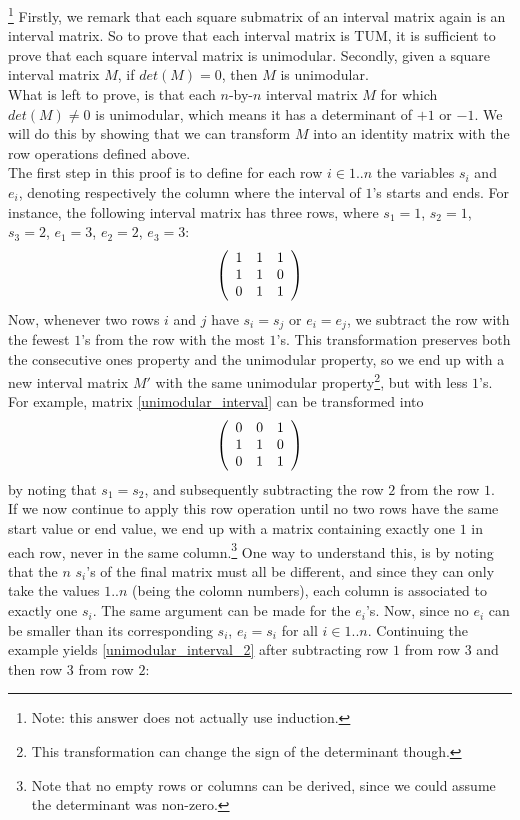 {\begin{exercise}
\begin{hint}
\begin{enumerate}
\end{enumerate}
\end{hint}
\begin{answer}
\footnote{Note: this answer does not actually use induction.}
Firstly, we remark that each square submatrix of an interval matrix again is an interval matrix. So to prove that each interval matrix is TUM, it is sufficient to prove that each square interval matrix is unimodular. Secondly, given a square interval matrix $M$, if $det(M)=0$, then $M$ is unimodular.\\
What is left to prove, is that each $n$-by-$n$ interval matrix $M$ for which $det(M)\neq 0$ is unimodular, which means it has a determinant of $+1$ or $-1$. We will do this by showing that we can transform $M$ into an identity matrix with the row operations defined above.\\
The first step in this proof is to define for each row $i \in 1..n$ the variables $s_i$ and $e_i$, denoting respectively the column where the interval of $1$'s starts and ends. For instance, the following interval matrix has three rows, where $s_1=1$, $s_2=1$, $s_3=2$, $e_1=3$, $e_2=2$, $e_3=3$:
\begin{equation}
\label{unimodular_interval}
\left( \begin{array}{ccc}
1&1&1\\
1&1&0\\
0&1&1
\end{array} \right)
\end{equation}
Now, whenever two rows $i$ and $j$ have $s_i=s_j$ or $e_i=e_j$, we subtract the row with the fewest $1$'s from the row with the most $1$'s. This transformation preserves both the consecutive ones property and the unimodular property, so we end up with a new interval matrix $M'$ with the same unimodular property\footnote{This transformation can change the sign of the determinant though.}, but with less $1$'s. For example, matrix \ref{unimodular_interval} can be transformed into
\begin{equation}
\left( \begin{array}{ccc}
0&0&1\\
1&1&0\\
0&1&1
\end{array} \right)
\end{equation}
by noting that $s_1=s_2$, and subsequently subtracting the row $2$ from the row $1$.\\
If we now continue to apply this row operation until no two rows have the same start value or end value, we end up with a matrix containing exactly one $1$ in each row, never in the same column.\footnote{Note that no empty rows or columns can be derived, since we could assume the determinant was non-zero.} One way to understand this, is by noting that the $n$ $s_i$'s of the final matrix must all be different, and since they can only take the values $1..n$ (being the colomn numbers), each column is associated to exactly one $s_i$. The same argument can be made for the $e_i$'s. Now, since no $e_i$ can be smaller than its corresponding $s_i$, $e_i=s_i$ for all $i \in 1..n$. Continuing the example yields \ref{unimodular_interval_2} after subtracting row $1$ from row $3$ and then row $3$ from row $2$:

\end{answer}
\end{exercise}}
